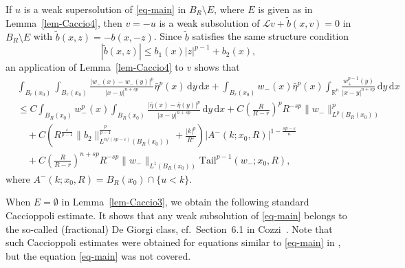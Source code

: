\documentclass[11pt]{amsart}
\theoremstyle{plain}
\theoremstyle{definition}
\numberwithin{equation}{section}
\begin{document}
If $u$ is a weak supersolution of \eqref{eq-main} in $B_R \setminus E$, where $E$ is given as in Lemma~\ref{lem-Caccio4}, then $v=-u$ is a weak subsolution of $\mathcal{L}v+\tilde{b}(x, v)=0$ in $B_R \setminus E$ with $\tilde{b}(x, z)=-b(x, -z)$. Since $\tilde{b}$ satisfies the same structure condition
\begin{equation*}
    |\tilde{b}(x, z)| \leq b_1(x) |z|^{p-1} + b_2(x),
\end{equation*}
an application of Lemma~\ref{lem-Caccio4} to $v$ shows that
\begin{equation}\label{eq-Caccio-super}
\begin{split}
&\int_{B_r(x_0)} \int_{B_r(x_0)} \frac{|w_-(x)-w_-(y)|^p}{|x-y|^{n+sp}} \bar{\eta}^p(x) \,\mathrm{d}y\,\mathrm{d}x + \int_{B_r(x_0)} w_-(x) \bar{\eta}^p(x) \int_{\mathbb{R}^n} \frac{w_+^{p-1}(y)}{|x-y|^{n+sp}} \,\mathrm{d}y \,\mathrm{d}x \\
&\leq C\int_{B_R(x_0)} w_-^p(x) \int_{B_R(x_0)} \frac{|\bar{\eta}(x)-\bar{\eta}(y)|^p}{|x-y|^{n+sp}} \,\mathrm{d}y \,\mathrm{d}x + C \left( \frac{R}{R-r} \right)^p R^{-sp} \|w_-\|_{L^p(B_R(x_0))}^p \\
&\quad + C \left( R^{\frac{\varepsilon}{p-1}}\|b_2\|^{\frac{p}{p-1}}_{L^{n/(sp-\varepsilon)}(B_R(x_0))} + \frac{|k|^p}{R^{\varepsilon}} \right) |A^-(k; x_0, R)|^{1-\frac{sp-\varepsilon}{n}} \\
&\quad + C \left( \frac{R}{R-r} \right)^{n+sp} R^{-sp} \|w_-\|_{L^1(B_R(x_0))} \mathrm{Tail}^{p-1}(w_-; x_0, R),
\end{split}
\end{equation}
where $A^-(k; x_0, R)=B_R(x_0) \cap \{u<k\}$.

When $E=\emptyset$ in Lemma~\ref{lem-Caccio3}, we obtain the following standard Caccioppoli estimate. It shows that any weak subsolution of \eqref{eq-main} belongs to the so-called (fractional) De Giorgi class, cf.\ Section~6.1 in Cozzi~\cite{Coz17}. Note that such Caccioppoli estimates were obtained for equations similar to \eqref{eq-main} in \cite[Proposition~8.5]{Coz17}, but the equation \eqref{eq-main} was not covered.
\end{document}
